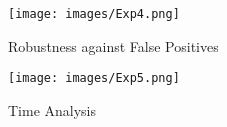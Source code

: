 \documentclass{bmvc2k}
\begin{document}

\begin{figure}[tb]
\begin{minipage}{0.5\textwidth}
\centering
 \texttt{[image: images/Exp4.png]}
 \caption{Robustness against False Positives}
  \label{fig:Exp4}
\end{minipage}
\begin{minipage}{0.5\textwidth}
\centering
  \texttt{[image: images/Exp5.png]} 
 \caption{Time Analysis}
 \label{fig:Exp5}
\end{minipage}
\end{figure}

\end{document}
